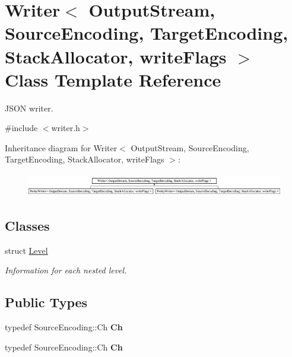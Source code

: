 \hypertarget{class_writer}{}\section{Writer$<$ Output\+Stream, Source\+Encoding, Target\+Encoding, Stack\+Allocator, write\+Flags $>$ Class Template Reference}
\label{class_writer}


J\+S\+ON writer.  




{\ttfamily \#include $<$writer.\+h$>$}

Inheritance diagram for Writer$<$ Output\+Stream, Source\+Encoding, Target\+Encoding, Stack\+Allocator, write\+Flags $>$\+:\begin{figure}[H]
\begin{center}
\leavevmode
\includegraphics[height=1.025641cm]{class_writer}
\end{center}
\end{figure}
\subsection*{Classes}
\begin{DoxyCompactItemize}
\item 
struct \hyperlink{struct_writer_1_1_level}{Level}
\begin{DoxyCompactList}\small\item\em Information for each nested level. \end{DoxyCompactList}\end{DoxyCompactItemize}
\subsection*{Public Types}
\begin{DoxyCompactItemize}
\item 
typedef Source\+Encoding\+::\+Ch {\bfseries Ch}\hypertarget{class_writer_ab08bff5fd2daec65f4a78779ca3d2139}{}\label{class_writer_ab08bff5fd2daec65f4a78779ca3d2139}

\item 
typedef Source\+Encoding\+::\+Ch {\bfseries Ch}\hypertarget{class_writer_ab08bff5fd2daec65f4a78779ca3d2139}{}\label{class_writer_ab08bff5fd2daec65f4a78779ca3d2139}

\end{DoxyCompactItemize}

